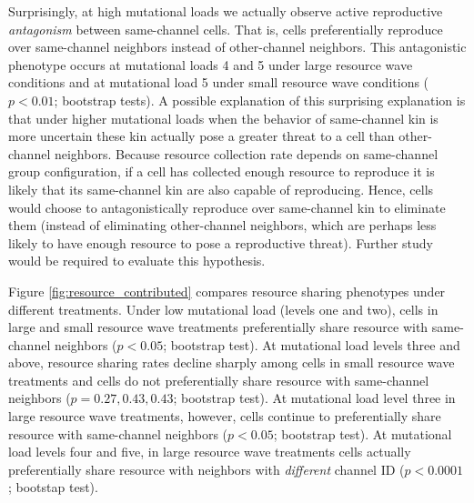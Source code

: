 Surprisingly, at high mutational loads we actually observe active reproductive \textit{antagonism} between same-channel cells.
That is, cells preferentially reproduce over same-channel neighbors instead of other-channel neighbors.
This antagonistic phenotype occurs at mutational loads 4 and 5 under large resource wave conditions and at mutational load 5 under small resource wave conditions ($p < 0.01$; bootstrap tests).
A possible explanation of this surprising explanation is that under higher mutational loads when the behavior of same-channel kin is more uncertain these kin actually pose a greater threat to a cell than other-channel neighbors.
Because resource collection rate depends on same-channel group configuration, if a cell has collected enough resource to reproduce it is likely that its same-channel kin are also capable of reproducing.
Hence, cells would choose to antagonistically reproduce over same-channel kin to eliminate them (instead of eliminating other-channel neighbors, which are perhaps less likely to have enough resource to pose a reproductive threat).
Further study would be required to evaluate this hypothesis.



Figure \ref{fig:resource_contributed} compares resource sharing phenotypes under different treatments.
Under low mutational load (levels one and two), cells in large and small resource wave treatments preferentially share resource with same-channel neighbors ($p < 0.05$; bootstrap test).
At mutational load levels three and above, resource sharing rates decline sharply among cells in small resource wave treatments and cells do not preferentially share resource with same-channel neighbors ($p = 0.27, 0.43, 0.43$; bootstrap test).
At mutational load level three in large resource wave treatments, however, cells continue to preferentially share resource with same-channel neighbors ($p < 0.05$; bootstrap test).
At mutational load levels four and five, in large resource wave treatments cells actually preferentially share resource with neighbors with \textit{different} channel ID ($p < 0.0001$; bootstap test).



